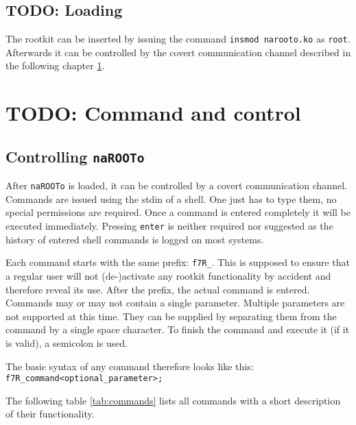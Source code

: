 \documentclass[10pt, letterpaper]{scrartcl}
\begin{document}
\subsection{TODO: Loading}
The rootkit can be inserted by issuing the command \texttt{insmod narooto.ko} as \texttt{root}.
Afterwards it can be controlled by the covert communication channel described in the following chapter \ref{sec:command_and_control}.

\section{TODO: Command and control}\label{sec:command_and_control}
\subsection{Controlling \texttt{naROOTo}}
After \texttt{naROOTo} is loaded, it can be controlled by a covert communication channel. 
Commands are issued using the stdin of a shell.
One just has to type them, no special permissions are required.
Once a command is entered completely it will be executed immediately. Pressing \texttt{enter} is neither required nor suggested as the history of entered shell commands is logged on most systems.

Each command starts with the same prefix: \texttt{f7R\_}.
This is supposed to ensure that a regular user will not (de-)activate any rootkit functionality by accident and therefore reveal its use.
After the prefix, the actual command is entered.
Commands may or may not contain a single parameter.
Multiple parameters are not supported at this time.
They can be supplied by separating them from the command by a single space character.
To finish the command and execute it (if it is valid), a semicolon is used.

The basic syntax of any command therefore looks like this: \texttt{f7R\_command\textvisiblespace <optional\_parameter>;} 

The following table \ref{tab:commands} lists all commands with a short description of their functionality.
\end{document}
